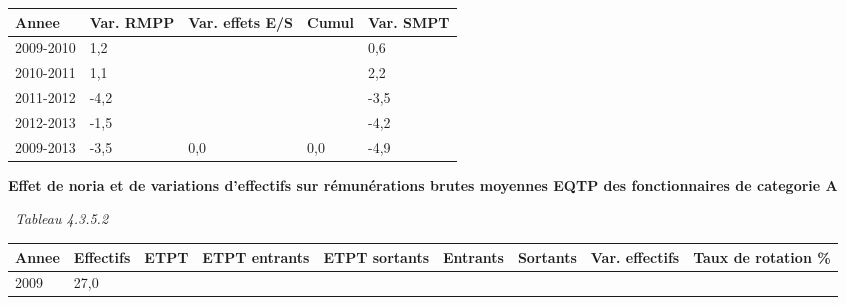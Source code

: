 \begin{longtable}[]{@{}lllll@{}}
\toprule
Annee & Var. RMPP & Var. effets E/S & Cumul & Var. SMPT\tabularnewline
\midrule
\endhead
2009-2010 & 1,2 & & & 0,6\tabularnewline
2010-2011 & 1,1 & & & 2,2\tabularnewline
2011-2012 & -4,2 & & & -3,5\tabularnewline
2012-2013 & -1,5 & & & -4,2\tabularnewline
2009-2013 & -3,5 & 0,0 & 0,0 & -4,9\tabularnewline
\bottomrule
\end{longtable}

\textbf{Effet de noria et de variations d'effectifs sur rémunérations
brutes moyennes EQTP des fonctionnaires de categorie A}

~\emph{Tableau 4.3.5.2}

\begin{longtable}[]{@{}lllllllll@{}}
\toprule
\begin{minipage}[b]{0.05\columnwidth}\raggedright
Annee\strut
\end{minipage} & \begin{minipage}[b]{0.08\columnwidth}\raggedright
Effectifs\strut
\end{minipage} & \begin{minipage}[b]{0.04\columnwidth}\raggedright
ETPT\strut
\end{minipage} & \begin{minipage}[b]{0.10\columnwidth}\raggedright
ETPT entrants\strut
\end{minipage} & \begin{minipage}[b]{0.10\columnwidth}\raggedright
ETPT sortants\strut
\end{minipage} & \begin{minipage}[b]{0.07\columnwidth}\raggedright
Entrants\strut
\end{minipage} & \begin{minipage}[b]{0.07\columnwidth}\raggedright
Sortants\strut
\end{minipage} & \begin{minipage}[b]{0.11\columnwidth}\raggedright
Var. effectifs\strut
\end{minipage} & \begin{minipage}[b]{0.14\columnwidth}\raggedright
Taux de rotation \%\strut
\end{minipage}\tabularnewline
\midrule
\endhead
\begin{minipage}[t]{0.05\columnwidth}\raggedright
2009\strut
\end{minipage} & \begin{minipage}[t]{0.08\columnwidth}\raggedright
27,0\strut
\end{minipage} & \begin{minipage}[t]{0.04\columnwidth}\raggedright

\end{minipage}
\end{longtable}
